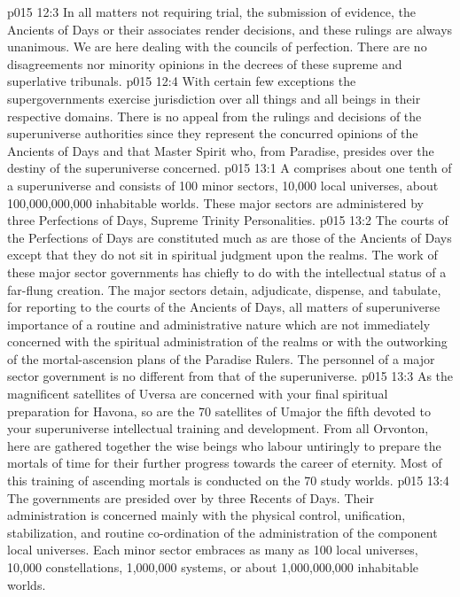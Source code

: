 \vs p015 12:3 In all matters not requiring trial, the submission of evidence, the Ancients of Days or their associates render decisions, and these rulings are always unanimous. We are here dealing with the councils of perfection. There are no disagreements nor minority opinions in the decrees of these supreme and superlative tribunals.
\vs p015 12:4 With certain few exceptions the supergovernments exercise jurisdiction over all things and all beings in their respective domains. There is no appeal from the rulings and decisions of the superuniverse authorities since they represent the concurred opinions of the Ancients of Days and that Master Spirit who, from Paradise, presides over the destiny of the superuniverse concerned.
\vs p015 13:1 A  comprises about one tenth of a superuniverse and consists of 100 minor sectors, 10,000 local universes, about 100,000,000,000 inhabitable worlds. These major sectors are administered by three Perfections of Days, Supreme Trinity Personalities.
\vs p015 13:2 The courts of the Perfections of Days are constituted much as are those of the Ancients of Days except that they do not sit in spiritual judgment upon the realms. The work of these major sector governments has chiefly to do with the intellectual status of a far\hyp{}flung creation. The major sectors detain, adjudicate, dispense, and tabulate, for reporting to the courts of the Ancients of Days, all matters of superuniverse importance of a routine and administrative nature which are not immediately concerned with the spiritual administration of the realms or with the outworking of the mortal\hyp{}ascension plans of the Paradise Rulers. The personnel of a major sector government is no different from that of the superuniverse.
\vs p015 13:3 As the magnificent satellites of Uversa are concerned with your final spiritual preparation for Havona, so are the 70 satellites of Umajor the fifth devoted to your superuniverse intellectual training and development. From all Orvonton, here are gathered together the wise beings who labour untiringly to prepare the mortals of time for their further progress towards the career of eternity. Most of this training of ascending mortals is conducted on the 70 study worlds.
\vs p015 13:4 \pc The  governments are presided over by three Recents of Days. Their administration is concerned mainly with the physical control, unification, stabilization, and routine co\hyp{}ordination of the administration of the component local universes. Each minor sector embraces as many as 100 local universes, 10,000 constellations, 1,000,000 systems, or about 1,000,000,000 inhabitable worlds.
